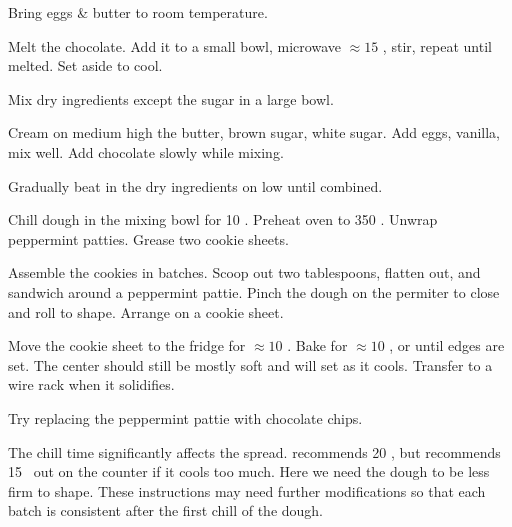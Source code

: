 \begin{preparation}
\item Bring eggs \& butter to room temperature.

\item Melt the chocolate.
	Add it to a small bowl, microwave $\approx 15$ \second, stir, repeat until melted.
	Set aside to cool.

\item Mix dry ingredients except the sugar in a large bowl.

\item Cream on medium high the butter, brown sugar, white sugar.
	Add eggs, vanilla, mix well.
	Add chocolate slowly while mixing.

\item Gradually beat in the dry ingredients on low until combined.

\item Chill dough in the mixing bowl for 10 \minute.
	Preheat oven to 350 \Fahrenheit.
	Unwrap peppermint patties.
	Grease two cookie sheets.

\item Assemble the cookies in batches.
	Scoop out two tablespoons, flatten out, and sandwich around a peppermint pattie.
	Pinch the dough on the permiter to close and roll to shape.
	Arrange on a cookie sheet.

\item Move the cookie sheet to the fridge for $\approx 10$ \minute.
	Bake for $\approx 10$ \minute, or until edges are set.
	The center should still be mostly soft and will set as it cools.
	Transfer to a wire rack when it solidifies.
\end{preparation}

\begin{variation}
\item Try replacing the peppermint pattie with chocolate chips.
\end{variation}


\begin{experiments}
\item The chill time significantly affects the spread.
	\citeauthor{sallyBrownies2020} \cite{sallyBrownies2020} recommends 20 \minute, but recommends 15 \minute~out on the counter if it cools too much.
	Here we need the dough to be less firm to shape.
	These instructions may need further modifications so that each batch is consistent after the first chill of the dough.
\end{experiments}


\recipeend
